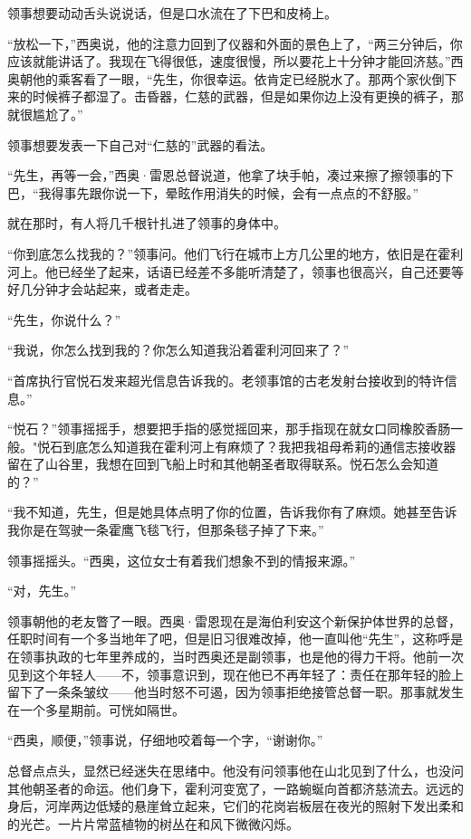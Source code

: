 \documentclass[AutoFakeBold=true]{book}
\begin{document}
领事想要动动舌头说说话，但是口水流在了下巴和皮椅上。

``放松一下，''西奥说，他的注意力回到了仪器和外面的景色上了，``两三分钟后，你应该就能讲话了。我现在飞得很低，速度很慢，所以要花上十分钟才能回济慈。''西奥朝他的乘客看了一眼，``先生，你很幸运。依肯定已经脱水了。那两个家伙倒下来的时候裤子都湿了。击昏器，仁慈的武器，但是如果你边上没有更换的裤子，那就很尴尬了。''

领事想要发表一下自己对``仁慈的''武器的看法。

``先生，再等一会，''西奥·雷恩总督说道，他拿了块手帕，凑过来擦了擦领事的下巴，``我得事先跟你说一下，晕眩作用消失的时候，会有一点点的不舒服。''

就在那时，有人将几千根针扎进了领事的身体中。

\vspace*{1em}

``你到底怎么找我的？''领事问。他们飞行在城市上方几公里的地方，依旧是在霍利河上。他已经坐了起来，话语已经差不多能听清楚了，领事也很高兴，自己还要等好几分钟才会站起来，或者走走。

``先生，你说什么？''

``我说，你怎么找到我的？你怎么知道我沿着霍利河回来了？''

``首席执行官悦石发来超光信息告诉我的。老领事馆的古老发射台接收到的特许信息。''

``悦石？''领事摇摇手，想要把手指的感觉摇回来，那手指现在就女口同橡胶香肠一般。"悦石到底怎么知道我在霍利河上有麻烦了？我把我祖母希莉的通信志接收器留在了山谷里，我想在回到飞船上时和其他朝圣者取得联系。悦石怎么会知道的？''

``我不知道，先生，但是她具体点明了你的位置，告诉我你有了麻烦。她甚至告诉我你是在驾驶一条霍鹰飞毯飞行，但那条毯子掉了下来。''

领事摇摇头。``西奥，这位女士有着我们想象不到的情报来源。''

``对，先生。''

领事朝他的老友瞥了一眼。西奥·雷恩现在是海伯利安这个新保护体世界的总督，任职时间有一个多当地年了吧，但是旧习很难改掉，他一直叫他``先生''，这称呼是在领事执政的七年里养成的，当时西奥还是副领事，也是他的得力干将。他前一次见到这个年轻人——不，领事意识到，现在他已不再年轻了：责任在那年轻的脸上留下了一条条皱纹——他当时怒不可遏，因为领事拒绝接管总督一职。那事就发生在一个多星期前。可恍如隔世。

``西奥，顺便，''领事说，仔细地咬着每一个字，``谢谢你。''

总督点点头，显然已经迷失在思绪中。他没有问领事他在山北见到了什么，也没问其他朝圣者的命运。他们身下，霍利河变宽了，一路蜿蜒向首都济慈流去。远远的身后，河岸两边低矮的悬崖耸立起来，它们的花岗岩板层在夜光的照射下发出柔和的光芒。一片片常蓝植物的树丛在和风下微微闪烁。
\end{document}
